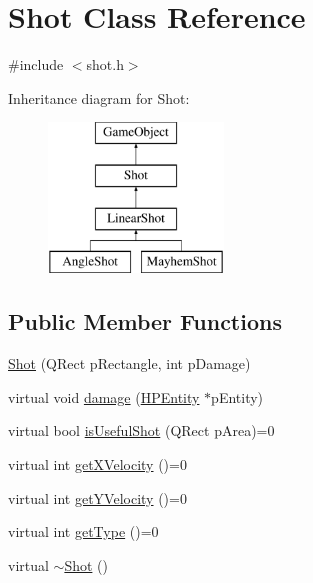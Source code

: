 \hypertarget{class_shot}{\section{Shot Class Reference}
\label{class_shot}
}


{\ttfamily \#include $<$shot.\-h$>$}

Inheritance diagram for Shot\-:\begin{figure}[H]
\begin{center}
\leavevmode
\includegraphics[height=4.000000cm]{class_shot}
\end{center}
\end{figure}
\subsection*{Public Member Functions}
\begin{DoxyCompactItemize}
\item 
\hyperlink{class_shot_a8fec158d22bc06cf7b8e4bc9c2328356}{Shot} (Q\-Rect p\-Rectangle, int p\-Damage)
\item 
virtual void \hyperlink{class_shot_a6f78a6d0f6e7e44619b0128c14ce5730}{damage} (\hyperlink{class_h_p_entity}{H\-P\-Entity} $\ast$p\-Entity)
\item 
virtual bool \hyperlink{class_shot_aa8acb047c32e567e066e75782744de62}{is\-Useful\-Shot} (Q\-Rect p\-Area)=0
\item 
virtual int \hyperlink{class_shot_a8cfb5cf554b6164f2dceef2e7263b8a0}{get\-X\-Velocity} ()=0
\item 
virtual int \hyperlink{class_shot_adad108f4ef3c792dc09eeb60a32d7479}{get\-Y\-Velocity} ()=0
\item 
virtual int \hyperlink{class_shot_a3bf2af64550a0ee1d467bdec43ac6200}{get\-Type} ()=0
\item 
virtual \hyperlink{class_shot_af090cf0eae5828befac25287e93b08f1}{$\sim$\-Shot} ()
\end{DoxyCompactItemize}
